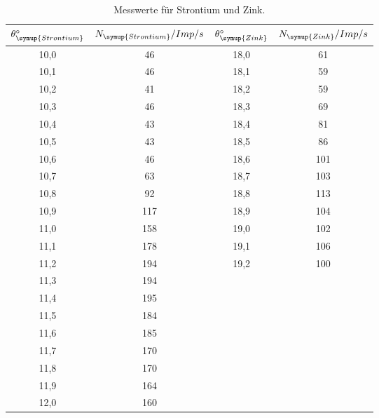 \begin{table}
  \centering
  \caption{Messwerte für Strontium und Zink.}
  \label{tab:strontiumZink}
  \begin{tabular}{c c | c c}
    \toprule
    $\theta_{\symup{Strontium}}^{\circ}$ & $N_{\symup{Strontium}}/Imp/s$ & $\theta_{\symup{Zink}}^{\circ}$ & $N_{\symup{Zink}}/Imp/s$ \\
    \midrule
    10,0 &  46 & 18,0 &  61 \\
    10,1 &  46 & 18,1 &  59 \\
    10,2 &  41 & 18,2 &  59 \\
    10,3 &  46 & 18,3 &  69 \\
    10,4 &  43 & 18,4 &  81 \\
    10,5 &  43 & 18,5 &  86 \\
    10,6 &  46 & 18,6 & 101 \\
    10,7 &  63 & 18,7 & 103 \\
    10,8 &  92 & 18,8 & 113 \\
    10,9 & 117 & 18,9 & 104 \\
    11,0 & 158 & 19,0 & 102 \\
    11,1 & 178 & 19,1 & 106 \\
    11,2 & 194 & 19,2 & 100 \\
    11,3 & 194 &      &     \\
    11,4 & 195 &      &     \\
    11,5 & 184 &      &     \\
    11,6 & 185 &      &     \\
    11,7 & 170 &      &     \\
    11,8 & 170 &      &     \\
    11,9 & 164 &      &     \\
    12,0 & 160 &      &     \\
    \bottomrule
  \end{tabular}
\end{table}

